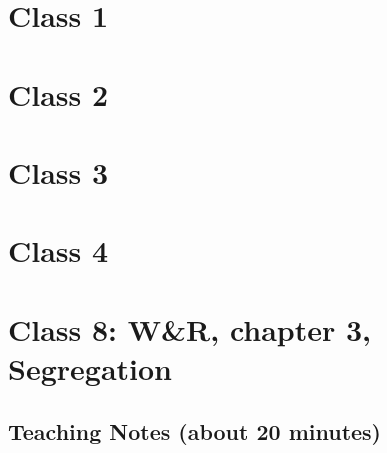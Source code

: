 \chapter{Class 1}

\chapter{Class 2}

\chapter{Class 3}

\chapter{Class 4}

\chapter{Class 8: W\&R, chapter 3, Segregation}

\section{Teaching Notes (about 20 minutes)}


